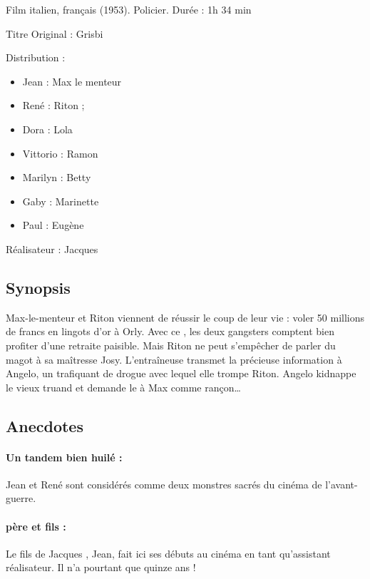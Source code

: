 Film italien, français (1953). Policier. Durée : 1h 34 min

Titre Original : Grisbi

Distribution :

\begin{itemize}
	\item Jean  : Max le menteur	
	\item René  : Riton ;
	\item Dora  : Lola	
	\item Vittorio  : Ramon	
	\item Marilyn  : Betty	
	\item Gaby  : Marinette	
	\item Paul  : Eugène
\end{itemize}

Réalisateur : Jacques 


\subsection*{Synopsis}

Max-le-menteur et Riton viennent de réussir le coup de leur vie : voler 50
millions de francs en lingots d'or à Orly. Avec ce , les deux
gangsters comptent bien profiter d'une retraite paisible. Mais Riton ne peut
s'empêcher de parler du magot à sa maîtresse Josy. L'entraîneuse transmet la
précieuse information à Angelo, un trafiquant de drogue avec lequel elle trompe Riton. Angelo kidnappe le vieux truand et demande le  à Max comme rançon\dots


\subsection*{Anecdotes}

\paragraph{Un tandem bien huilé :} Jean  et René 
 sont considérés comme deux monstres sacrés du cinéma de
l'avant-guerre.

\paragraph{ père et fils :} Le fils de Jacques 
, Jean, fait ici ses débuts au cinéma en tant qu'assistant
réalisateur. Il n'a pourtant que quinze ans !

